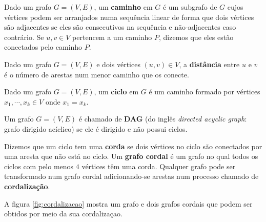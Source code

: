 \vspace{2em}

Dado um grafo $G = (V, E)$, um \textbf{caminho} em $G$ é um subgrafo de $G$ cujos vértices podem ser arranjados numa sequência linear de forma que dois vértices são adjacentes se eles são consecutivos na sequência e não-adjacentes caso contrário. Se $u, v \in V$ pertencem a um caminho $P$, dizemos que eles estão conectados pelo caminho $P$.

\vspace{2em}

Dado um grafo $G = (V, E)$ e dois vértices $(u, v) \in V$, a \textbf{distância} entre $u$ e $v$ é o número de arestas num menor caminho que os conecte.

\vspace{2em}

Dado um grafo $G = (V, E)$, um \textbf{ciclo} em $G$ é um caminho formado por vértices $x_1, \cdots, x_k \in V$ onde $x_1 = x_k$.

\vspace{2em}

Um grafo $G = (V, E)$ é chamado de \textbf{DAG} (do inglês \emph{directed acyclic graph}: grafo dirigido acíclico) se ele é dirigido e não possui ciclos.

\vspace{2em}

Dizemos que um ciclo tem uma \textbf{corda} se dois vértices no ciclo são conectados por uma aresta que não está no ciclo. Um \textbf{grafo cordal} é um grafo no qual todos os ciclos com pelo menos $4$ vértices têm uma corda. Qualquer grafo pode ser transformado num grafo cordal adicionando-se arestas num processo chamado de \textbf{cordalização}.

A figura \ref{fig:cordalizacao} mostra um grafo e dois grafos cordais que podem ser obtidos por meio da sua cordalizaçao.

